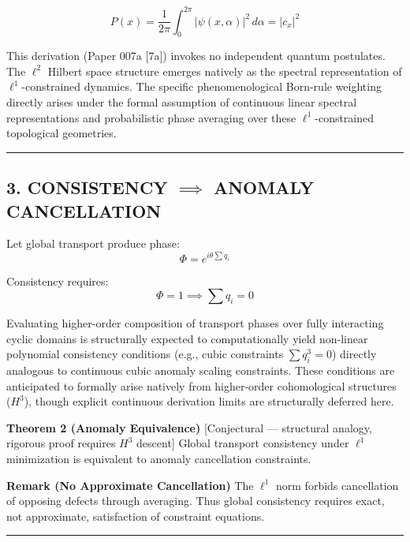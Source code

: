 \documentclass[
]{article}
\begin{document}
\[P(x) = \frac{1}{2\pi}\int_0^{2\pi} |\psi(x,\alpha)|^2 \, d\alpha = |c_x|^2\]

This derivation (Paper 007a {[}7a{]}) invokes no independent quantum
postulates. The \(\ell^2\) Hilbert space structure emerges natively as
the spectral representation of \(\ell^1\)-constrained dynamics. The
specific phenomenological Born-rule weighting directly arises under the
formal assumption of continuous linear spectral representations and
probabilistic phase averaging over these \(\ell^1\)-constrained
topological geometries.

\begin{center}\rule{0.5\linewidth}{0.5pt}\end{center}

\subsection{\texorpdfstring{3. CONSISTENCY \(\implies\) ANOMALY
CANCELLATION}{3. CONSISTENCY \textbackslash implies ANOMALY CANCELLATION}}\label{consistency-implies-anomaly-cancellation}

Let global transport produce phase: \[
\Phi = e^{i\theta \sum q_i}
\]

Consistency requires: \[
\Phi = 1 \implies \sum q_i = 0
\]

Evaluating higher-order composition of transport phases over fully
interacting cyclic domains is structurally expected to computationally
yield non-linear polynomial consistency conditions (e.g., cubic
constraints \(\sum q_i^3 = 0\)) directly analogous to continuous cubic
anomaly scaling constraints. These conditions are anticipated to
formally arise natively from higher-order cohomological structures
(\(H^3\)), though explicit continuous derivation limits are structurally
deferred here.

\textbf{Theorem 2 (Anomaly Equivalence)} {[}Conjectural --- structural
analogy, rigorous proof requires \(H^3\) descent{]} Global transport
consistency under \(\ell^1\) minimization is equivalent to anomaly
cancellation constraints.

\textbf{Remark (No Approximate Cancellation)} The \(\ell^1\) norm
forbids cancellation of opposing defects through averaging. Thus global
consistency requires exact, not approximate, satisfaction of constraint
equations.

\begin{center}\rule{0.5\linewidth}{0.5pt}\end{center}
\end{document}
